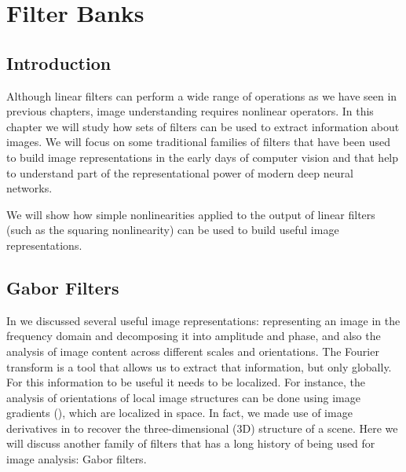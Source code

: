 
\chapter{Filter Banks}
\label{chapter:filter_banks}

\section{Introduction}

Although linear filters can perform a wide range of operations as we have seen in previous chapters, image understanding requires nonlinear operators. In this chapter we will study how sets of filters can be used to extract information about images. We will focus on some traditional families of filters that have been used to build image representations in the early days of computer vision and that help to understand part of the representational power of modern deep neural networks. 

We will show how simple nonlinearities applied to the output of linear filters (such as the squaring nonlinearity) can be used to build useful image representations.


\section{Gabor Filters}

In \chap{\ref{chapter:fourier_analysis}} we discussed several useful image representations: representing an image in the frequency domain and decomposing it into amplitude and phase, and also the analysis of image content across different scales and orientations. The Fourier transform is a tool that allows us to extract that information, but only globally. For this information to be useful it needs to be localized. For instance, the analysis of orientations of local image structures can be done using image gradients (\chap{\ref{chapter:image_derivatives}}), which are localized in space. In fact, we made use of image derivatives in \chap{\ref{chapter:simplesystem}} to recover the three-dimensional (3D) structure of a scene. Here we will discuss another family of filters that has a long history of being used for image analysis: Gabor filters.

